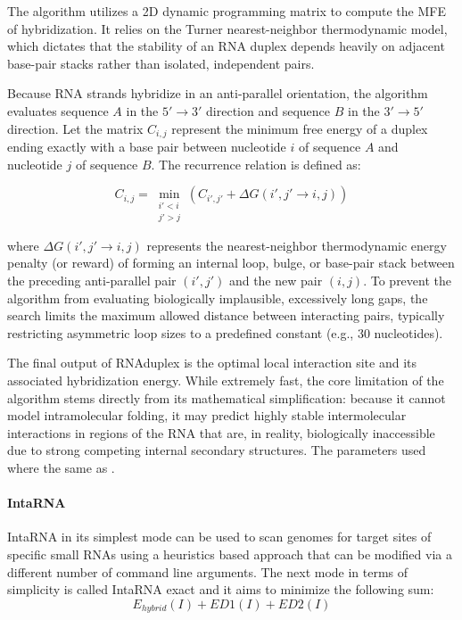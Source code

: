 \documentclass[en,ack]{dimscthesis}
\begin{document}
The algorithm utilizes a 2D dynamic programming matrix to compute the MFE of hybridization. It relies on the Turner nearest-neighbor thermodynamic model, which dictates that the stability of an RNA duplex depends heavily on adjacent base-pair stacks rather than isolated, independent pairs.

Because RNA strands hybridize in an anti-parallel orientation, the algorithm evaluates sequence $A$ in the $5' \to 3'$ direction and sequence $B$ in the $3' \to 5'$ direction. Let the matrix $C_{i,j}$ represent the minimum free energy of a duplex ending exactly with a base pair between nucleotide $i$ of sequence $A$ and nucleotide $j$ of sequence $B$. The recurrence relation is defined as:

\begin{equation}
	C_{i,j} = \min_{\substack{i' < i \\ j' > j}} \left( C_{i',j'} + \Delta G(i', j' \to i, j) \right)
\end{equation}

where $\Delta G(i', j' \to i, j)$ represents the nearest-neighbor thermodynamic energy penalty (or reward) of forming an internal loop, bulge, or base-pair stack between the preceding anti-parallel pair $(i', j')$ and the new pair $(i, j)$. To prevent the algorithm from evaluating biologically implausible, excessively long gaps, the search limits the maximum allowed distance between interacting pairs, typically restricting asymmetric loop sizes to a predefined constant (e.g., 30 nucleotides).

The final output of RNAduplex is the optimal local interaction site and its associated hybridization energy. While extremely fast, the core limitation of the algorithm stems directly from its mathematical simplification: because it cannot model intramolecular folding, it may predict highly stable intermolecular interactions in regions of the RNA that are, in reality, biologically inaccessible due to strong competing internal secondary structures. The parameters used where the same as \cite{zacharopoulouMicroTCNNAvantgardeDeep2024}.

\paragraph{IntaRNA}
IntaRNA in its simplest mode can be used to scan genomes for target sites of specific small RNAs using a heuristics based approach that can be modified via a different number of command line arguments. The next mode in terms of simplicity is called IntaRNA exact and it aims to minimize the following sum:
\begin{equation}
	E_{hybrid}(I) + ED1(I) + ED2(I)	
\end{equation}
\end{document}
